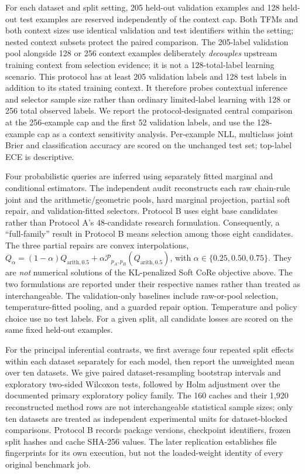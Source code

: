 \documentclass[a4paper,fleqn]{cas-sc}
\begin{document}
For each dataset and split setting, 205 held-out validation examples and 128 held-out test examples are reserved independently of the context cap. Both TFMs and both context sizes use identical validation and test identifiers within the setting; nested context subsets protect the paired comparison. The 205-label validation pool alongside 128 or 256 context examples deliberately \emph{decouples} upstream training context from selection evidence; it is not a 128-total-label learning scenario. This protocol has at least 205 validation labels and 128 test labels in addition to its stated training context. It therefore probes contextual inference and selector sample size rather than ordinary limited-label learning with 128 or 256 total observed labels. We report the protocol-designated central comparison at the 256-example cap and the first 52 validation labels, and use the 128-example cap as a context sensitivity analysis. Per-example NLL, multiclass joint Brier and classification accuracy are scored on the unchanged test set; top-label ECE is descriptive.

Four probabilistic queries are inferred using separately fitted marginal and conditional estimators. The independent audit reconstructs each raw chain-rule joint and the arithmetic/geometric pools, hard marginal projection, partial soft repair, and validation-fitted selectors. Protocol B uses eight base candidates rather than Protocol A's 48-candidate research formulation. Consequently, a ``full-family'' result in Protocol B means selection among those eight candidates. The three partial repairs are convex interpolations,
$Q_{\alpha}=(1-\alpha)Q_{\mathrm{arith},0.5}+\alpha\mathcal{P}_{p_A,p_B}(Q_{\mathrm{arith},0.5})$, with $\alpha\in\{0.25,0.50,0.75\}$. They are \emph{not} numerical solutions of the KL-penalized Soft CoRe objective above. The two formulations are reported under their respective names rather than treated as interchangeable. The validation-only baselines include raw-or-pool selection, temperature-fitted pooling, and a guarded repair option. Temperature and policy choice use no test labels. For a given split, all candidate losses are scored on the same fixed held-out examples.

For the principal inferential contrasts, we first average four repeated split effects within each dataset separately for each model, then report the unweighted mean over ten datasets. We give paired dataset-resampling bootstrap intervals and exploratory two-sided Wilcoxon tests, followed by Holm adjustment over the documented primary exploratory policy family. The 160 caches and their 1,920 reconstructed method rows are not interchangeable statistical sample sizes; only ten datasets are treated as independent experimental units for dataset-blocked comparisons. Protocol B records package versions, checkpoint identifiers, frozen split hashes and cache SHA-256 values. The later replication establishes file fingerprints for its own execution, but not the loaded-weight identity of every original benchmark job.
\end{document}
